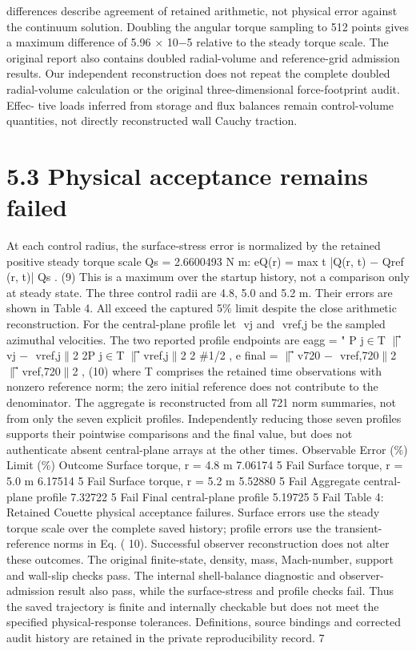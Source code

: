 \documentclass[11pt]{article}
\begin{document}
differences describe agreement of retained arithmetic, not physical error against the continuum
solution.
Doubling the angular torque sampling to 512 points gives a maximum difference of 5.96 \ensuremath{\times} 10\ensuremath{-}5
relative to the steady torque scale. The original report also contains doubled radial-volume and
reference-grid admission results. Our independent reconstruction does not repeat the complete
doubled radial-volume calculation or the original three-dimensional force-footprint audit. Effec-
tive loads inferred from storage and flux balances remain control-volume quantities, not directly
reconstructed wall Cauchy traction.

\section*{5.3 Physical acceptance remains failed}

At each control radius, the surface-stress error is normalized by the retained positive steady torque
scale Qs = 2.6600493 N m:
eQ(r) = max
t
|Q(r, t) \ensuremath{-} Qref (r, t)|
Qs
. (9)
This is a maximum over the startup history, not a comparison only at steady state. The three
control radii are 4.8, 5.0 and 5.2 m. Their errors are shown in Table 4. All exceed the captured 5\%
limit despite the close arithmetic reconstruction.
For the central-plane profile let ⃗ vj and ⃗ vref,j be the sampled azimuthal velocities. The two reported
profile endpoints are
eagg =
" P
j\ensuremath{\in}T \ensuremath{\parallel}⃗ vj \ensuremath{-} ⃗ vref,j\ensuremath{\parallel}2
2P
j\ensuremath{\in}T \ensuremath{\parallel}⃗ vref,j\ensuremath{\parallel}2
2
\#1/2
, e final = \ensuremath{\parallel}⃗ v720 \ensuremath{-} ⃗ vref,720\ensuremath{\parallel}2
\ensuremath{\parallel}⃗ vref,720\ensuremath{\parallel}2
, (10)
where T comprises the retained time observations with nonzero reference norm; the zero initial
reference does not contribute to the denominator. The aggregate is reconstructed from all 721
norm summaries, not from only the seven explicit profiles. Independently reducing those seven
profiles supports their pointwise comparisons and the final value, but does not authenticate absent
central-plane arrays at the other times.
Observable Error (\%) Limit (\%) Outcome
Surface torque, r = 4.8 m 7.06174 5 Fail
Surface torque, r = 5.0 m 6.17514 5 Fail
Surface torque, r = 5.2 m 5.52880 5 Fail
Aggregate central-plane profile 7.32722 5 Fail
Final central-plane profile 5.19725 5 Fail
Table 4: Retained Couette physical acceptance failures. Surface errors use the steady torque
scale over the complete saved history; profile errors use the transient-reference norms in Eq. ( 10).
Successful observer reconstruction does not alter these outcomes.
The original finite-state, density, mass, Mach-number, support and wall-slip checks pass. The
internal shell-balance diagnostic and observer-admission result also pass, while the surface-stress
and profile checks fail. Thus the saved trajectory is finite and internally checkable but does not
meet the specified physical-response tolerances.
Definitions, source bindings and corrected audit history are retained in the private reproducibility
record.
7
\end{document}
